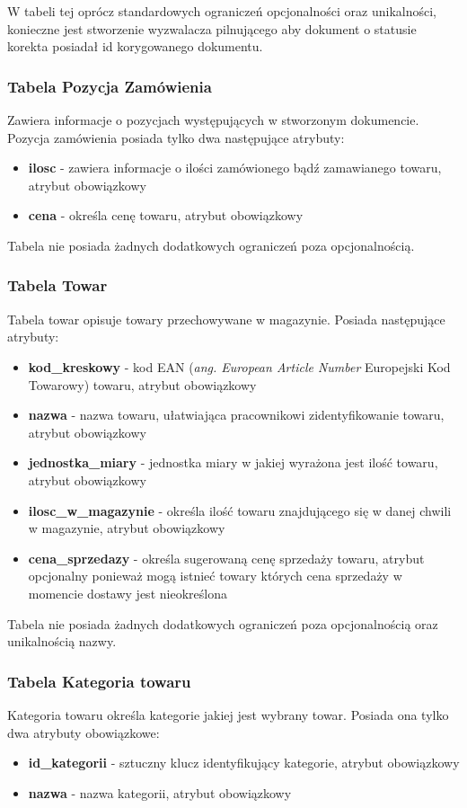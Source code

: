 W tabeli tej oprócz standardowych ograniczeń opcjonalności oraz unikalności,
konieczne jest stworzenie wyzwalacza pilnującego aby dokument o statusie korekta
posiadał id korygowanego dokumentu.

\subsubsection{Tabela Pozycja Zamówienia}
Zawiera informacje o pozycjach występujących w stworzonym dokumencie. Pozycja
zamówienia posiada tylko dwa następujące atrybuty:
\begin{itemize}
  \item \textbf{ilosc} - zawiera informacje o ilości zamówionego bądź
  zamawianego towaru, atrybut obowiązkowy
  \item \textbf{cena} - określa cenę towaru, atrybut obowiązkowy
\end{itemize} 

Tabela nie posiada żadnych dodatkowych ograniczeń poza opcjonalnością.

\subsubsection{Tabela Towar}
Tabela towar opisuje towary przechowywane w magazynie. Posiada następujące
atrybuty:
\begin{itemize}
  \item \textbf{kod\_kreskowy} - kod EAN (\textit{ang. European Article
  Number} Europejski Kod Towarowy) towaru, atrybut obowiązkowy
  \item \textbf{nazwa} - nazwa towaru, ułatwiająca pracownikowi zidentyfikowanie
  towaru, atrybut obowiązkowy
  \item \textbf{jednostka\_miary} - jednostka miary w jakiej wyrażona jest ilość
  towaru, atrybut obowiązkowy
  \item \textbf{ilosc\_w\_magazynie} - określa ilość towaru znajdującego się w
  danej chwili w magazynie, atrybut obowiązkowy
  \item \textbf{cena\_sprzedazy} - określa sugerowaną cenę sprzedaży towaru,
  atrybut opcjonalny ponieważ mogą istnieć towary których cena sprzedaży w
  momencie dostawy jest nieokreślona
\end{itemize}

Tabela nie posiada żadnych dodatkowych ograniczeń poza opcjonalnością oraz
unikalnością nazwy.

\subsubsection{Tabela Kategoria towaru}
Kategoria towaru określa kategorie jakiej jest wybrany towar. Posiada ona tylko
dwa atrybuty obowiązkowe:
\begin{itemize}
  \item \textbf{id\_kategorii} - sztuczny klucz identyfikujący kategorie,
  atrybut obowiązkowy
  \item \textbf{nazwa} - nazwa kategorii, atrybut obowiązkowy
\end{itemize}

